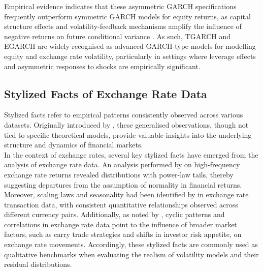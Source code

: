 \documentclass[oneside,12pt]{CUEDthesisPSnPDF}
\newcommand{\textcite}{\citet}
\newcommand{\parencite}{\citep}
\begin{document}
Empirical evidence indicates that these asymmetric GARCH specifications frequently outperform symmetric GARCH models for equity returns, as capital structure effects and volatility-feedback mechanisms amplify the influence of negative returns on future conditional variance \parencite{campbell1992no}. As such, TGARCH and EGARCH are widely recognised as advanced GARCH-type models for modelling equity and exchange rate volatility, particularly in settings where leverage effects and asymmetric responses to shocks are empirically significant.\\



\subsection{Stylized Facts of Exchange Rate Data}
\noindent 
Stylized facts refer to empirical patterns consistently observed across various datasets. Originally introduced by \textcite{cont2001empirical}, these generalised observations, though not tied to specific theoretical models, provide valuable insights into the underlying structure and dynamics of financial markets.\\

In the context of exchange rates, several key stylized facts have emerged from the analysis of exchange rate data. An analysis performed by \textcite{julio2015stylized} on high-frequency exchange rate returns revealed distributions with power-law tails, thereby suggesting departures from the assumption of normality in financial returns. Moreover, scaling laws and seasonality had been identified by \textcite{aloud2013stylized} in exchange rate transaction data, with consistent quantitative relationships observed across different currency pairs. Additionally, as noted by \textcite{julio2015stylized}, cyclic patterns and correlations in exchange rate data point to the influence of broader market factors, such as carry trade strategies and shifts in investor risk appetite, on exchange rate movements. Accordingly, these stylized facts are commonly used as qualitative benchmarks when evaluating the realism of volatility models and their residual distributions.\\
\end{document}
